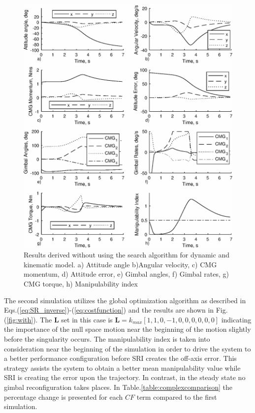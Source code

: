 \documentclass[journal]{new-aiaa}
\begin{document}
\begin{figure}[H]
\centering
\includegraphics[width=6in]{0test.eps}
\caption{Results derived without using the search algorithm for dynamic and kinematic model. a) Attitude angle b)Angular velocity, c) CMG momentum, d) Attitude error, e) Gimbal angles, f) Gimbal rates, g) CMG torque, h) Manipulability index}
\label{fig:without}
\end{figure}
The second simulation utilizes the global optimization algorithm as described in Eqs.(\ref{eq:SR_inverse})-(\ref{eq:costfunction}) and the results are shown in Fig.(\ref{fig:with}). The $\textbf{L}$ set in this case is $ \textbf{L}=k_{max}[ 1,     1,     0,    -1,     0,     0,     0,     0, 0, 0]$ indicating the importance of the null space motion near the beginning of the motion slightly before the singularity occurs.
The manipulability index is taken into consideration near the beginning of the simulation in order to drive the system to a better performance configuration before SRI creates the off-axis error. 
This strategy assists the system to obtain a better mean manipulability value while SRI is creating the error upon the trajectory. 
In contrast, in the steady state no gimbal reconfiguration takes places. In Table.\ref{table:complexcomparison} the percentage change is presented for each $CF$ term compared to the first simulation.
\end{document}
